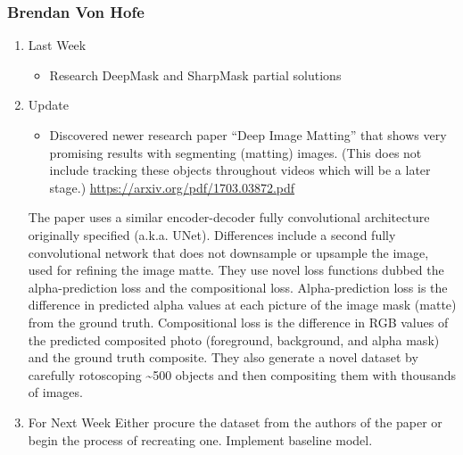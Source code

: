 \documentclass[15pt]{article}
\begin{document}
\subsubsection{Brendan Von Hofe}
\label{sec:org953dd5d}
\begin{enumerate}
\item Last Week
\label{sec:orgddd90d4}
\begin{itemize}
\item Research DeepMask and SharpMask partial solutions
\end{itemize}

\item Update
\label{sec:org47af881}
\begin{itemize}
\item Discovered newer research paper “Deep Image Matting” that shows very promising results with segmenting (matting) images. (This does not include tracking these objects throughout videos which will be a later stage.) \url{https://arxiv.org/pdf/1703.03872.pdf}
\end{itemize}
The paper uses a similar encoder-decoder fully convolutional architecture originally specified (a.k.a. UNet).
Differences include a second fully convolutional network that does not downsample or upsample the image, used for refining the image matte.
They use novel loss functions dubbed the alpha-prediction loss and the compositional loss.
Alpha-prediction loss is the difference in predicted alpha values at each picture of the image mask (matte) from the ground truth.
Compositional loss is the difference in RGB values of the predicted composited photo (foreground, background, and alpha mask) and the ground truth composite.
They also generate a novel dataset by carefully rotoscoping \textasciitilde{}500 objects and then compositing them with thousands of images.
\item For Next Week
\label{sec:org196c672}
Either procure the dataset from the authors of the paper or begin the process of recreating one.
Implement baseline model.
\end{enumerate}
\end{document}

